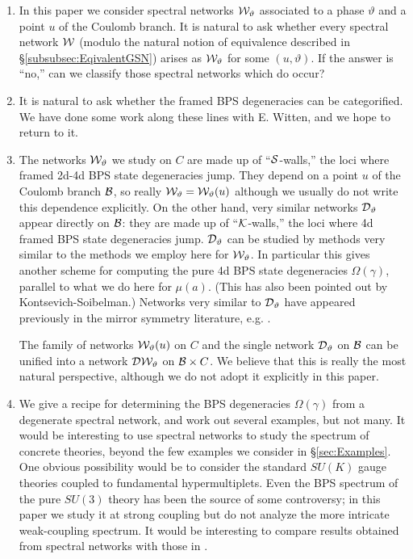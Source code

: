 \documentclass[11pt,a4paper]{article}
\def\CK {{\cal K}}
\def\wnet {{\cal W}}
\def\knet {{\cal D}}
\def\CB {{\cal B}}
\def\CS {{\cal S}}
\def\CK{{\cal K}}
\def\CB {{\cal B}}
\def\CK {{\cal K}}
\def\wnet {{\cal W}}
\def\CB {{\cal B}}
\def\CS {{\cal S}}
\def\CK{{\cal K}}
\begin{document}
\begin{enumerate}
\item In this paper we consider spectral networks $\wnet_\vartheta$ associated to a phase $\vartheta$ and a point $u$ of the Coulomb branch.  It is natural to ask whether every spectral network $\wnet$
(modulo the natural notion of equivalence described in \S\ref{subsubsec:EqivalentGSN}) arises as $\wnet_\vartheta$ for some $(u, \vartheta)$.  If the answer is ``no,'' can we classify those spectral networks which do occur?

\item It is natural to ask whether the framed BPS degeneracies can be categorified.
We have done some work along these lines with E. Witten, and we hope to return to it.

\item The networks $\wnet_\vartheta$
we study on $C$ are made up of ``$\CS$-walls,'' the loci where framed 2d-4d BPS state degeneracies jump.
They depend on a point $u$ of the Coulomb branch $\CB$, so really $\wnet_\vartheta = \wnet_\vartheta(u)$
although we usually do not write this dependence
explicitly.
On the other hand, very similar networks $\knet_\vartheta$ appear directly on $\CB$:
they are made up of ``$\CK$-walls,'' the loci where 4d framed BPS state degeneracies jump.
$\knet_\vartheta$ can be studied by methods very similar to the methods we employ here for $\wnet_\vartheta$.
In particular this gives another scheme for computing the pure 4d BPS state degeneracies $\Omega(\gamma)$,
parallel to what we do here for $\mu(a)$.  (This has also been pointed out by Kontsevich-Soibelman.)
Networks very similar to $\knet_\vartheta$ have appeared previously in the mirror symmetry literature,
e.g. \cite{MR2181810,MR2386535,Gross2007,Gross2009,Gross2011}.

The family of networks $\wnet_\vartheta(u)$ on $C$ and the single network $\knet_\vartheta$ on $\CB$
can be unified into a network $\knet\wnet_\vartheta$ on $\CB \times C$.  We believe that this
is really the most natural perspective, although we do not adopt it explicitly in this paper.

\item We give a recipe for determining the BPS degeneracies $\Omega(\gamma)$ from a degenerate
spectral network, and work out several examples, but not many.
It would be interesting to use spectral networks to study the spectrum of concrete theories, beyond
the few examples we consider in \S\ref{sec:Examples}.
One obvious possibility would be to consider the standard $SU(K)$ gauge theories coupled to
fundamental hypermultiplets.  Even the BPS spectrum of the pure $SU(3)$ theory has been the source of
some controversy; in this paper we study it at strong coupling but do not analyze the more intricate
weak-coupling spectrum.  It would be interesting to compare results obtained from
spectral networks with those in \cite{Fraser:1996pw,Taylor:2001hg,Taylor:2002sg,Chen:2011gk}.


\end{enumerate}
\end{document}

